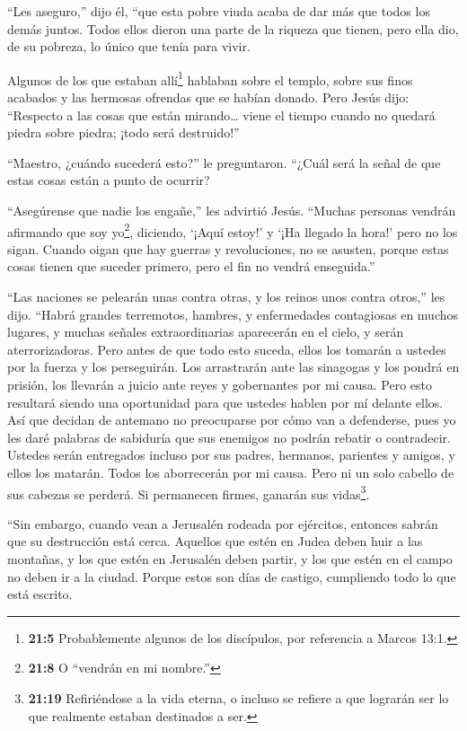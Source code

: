  ``Les aseguro,'' dijo él, ``que esta pobre viuda acaba de
dar más que todos los demás juntos.  Todos ellos dieron una
parte de la riqueza que tienen, pero ella dio, de su pobreza, lo único
que tenía para vivir.

 Algunos de los que estaban allí\footnote{\textbf{21:5}
  Probablemente algunos de los discípulos, por referencia a Marcos 13:1.}
hablaban sobre el templo, sobre sus finos acabados y las hermosas
ofrendas que se habían donado. Pero Jesús dijo:  ``Respecto
a las cosas que están mirando\ldots{} viene el tiempo cuando no quedará
piedra sobre piedra; ¡todo será destruido!''

 ``Maestro, ¿cuándo sucederá esto?'' le preguntaron. ``¿Cuál
será la señal de que estas cosas están a punto de ocurrir?

 ``Asegúrense que nadie los engañe,'' les advirtió Jesús.
``Muchas personas vendrán afirmando que soy yo\footnote{\textbf{21:8} O
  ``vendrán en mi nombre.''}, diciendo, `¡Aquí estoy!' y `¡Ha llegado la
hora!' pero no los sigan.  Cuando oigan que hay guerras y
revoluciones, no se asusten, porque estas cosas tienen que suceder
primero, pero el fin no vendrá enseguida.''

 ``Las naciones se pelearán unas contra otras, y los reinos
unos contra otros,'' les dijo.  ``Habrá grandes terremotos,
hambres, y enfermedades contagiosas en muchos lugares, y muchas señales
extraordinarias aparecerán en el cielo, y serán aterrorizadoras.
 Pero antes de que todo esto suceda, ellos los tomarán a
ustedes por la fuerza y los perseguirán. Los arrastrarán ante las
sinagogas y los pondrá en prisión, los llevarán a juicio ante reyes y
gobernantes por mi causa.  Pero esto resultará siendo una
oportunidad para que ustedes hablen por mí delante ellos. 
Así que decidan de antemano no preocuparse por cómo van a defenderse,
 pues yo les daré palabras de sabiduría que sus enemigos no
podrán rebatir o contradecir.  Ustedes serán entregados
incluso por sus padres, hermanos, parientes y amigos, y ellos los
matarán.  Todos los aborrecerán por mi causa. 
Pero ni un solo cabello de sus cabezas se perderá.  Si
permanecen firmes, ganarán sus vidas\footnote{\textbf{21:19}
  Refiriéndose a la vida eterna, o incluso se refiere a que lograrán ser
  lo que realmente estaban destinados a ser.}.

 ``Sin embargo, cuando vean a Jerusalén rodeada por
ejércitos, entonces sabrán que su destrucción está cerca. 
Aquellos que estén en Judea deben huir a las montañas, y los que estén
en Jerusalén deben partir, y los que estén en el campo no deben ir a la
ciudad.  Porque estos son días de castigo, cumpliendo todo
lo que está escrito.


